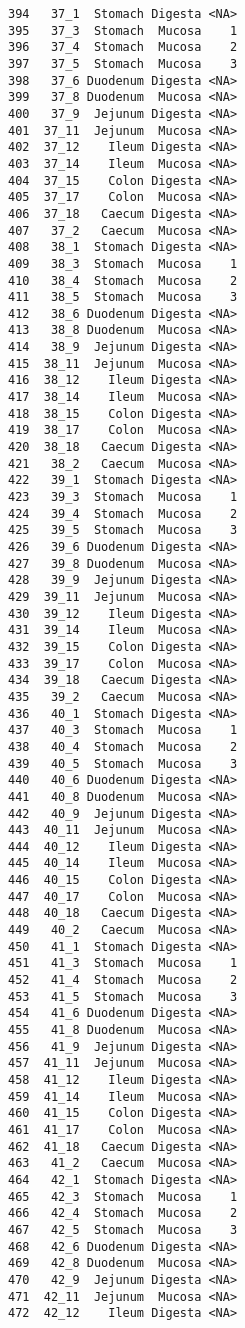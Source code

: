 \documentclass[
  letterpaper,
  DIV=11,
  numbers=noendperiod]{scrartcl}
\begin{document}
\begin{verbatim}
394   37_1  Stomach Digesta <NA>
395   37_3  Stomach  Mucosa    1
396   37_4  Stomach  Mucosa    2
397   37_5  Stomach  Mucosa    3
398   37_6 Duodenum Digesta <NA>
399   37_8 Duodenum  Mucosa <NA>
400   37_9  Jejunum Digesta <NA>
401  37_11  Jejunum  Mucosa <NA>
402  37_12    Ileum Digesta <NA>
403  37_14    Ileum  Mucosa <NA>
404  37_15    Colon Digesta <NA>
405  37_17    Colon  Mucosa <NA>
406  37_18   Caecum Digesta <NA>
407   37_2   Caecum  Mucosa <NA>
408   38_1  Stomach Digesta <NA>
409   38_3  Stomach  Mucosa    1
410   38_4  Stomach  Mucosa    2
411   38_5  Stomach  Mucosa    3
412   38_6 Duodenum Digesta <NA>
413   38_8 Duodenum  Mucosa <NA>
414   38_9  Jejunum Digesta <NA>
415  38_11  Jejunum  Mucosa <NA>
416  38_12    Ileum Digesta <NA>
417  38_14    Ileum  Mucosa <NA>
418  38_15    Colon Digesta <NA>
419  38_17    Colon  Mucosa <NA>
420  38_18   Caecum Digesta <NA>
421   38_2   Caecum  Mucosa <NA>
422   39_1  Stomach Digesta <NA>
423   39_3  Stomach  Mucosa    1
424   39_4  Stomach  Mucosa    2
425   39_5  Stomach  Mucosa    3
426   39_6 Duodenum Digesta <NA>
427   39_8 Duodenum  Mucosa <NA>
428   39_9  Jejunum Digesta <NA>
429  39_11  Jejunum  Mucosa <NA>
430  39_12    Ileum Digesta <NA>
431  39_14    Ileum  Mucosa <NA>
432  39_15    Colon Digesta <NA>
433  39_17    Colon  Mucosa <NA>
434  39_18   Caecum Digesta <NA>
435   39_2   Caecum  Mucosa <NA>
436   40_1  Stomach Digesta <NA>
437   40_3  Stomach  Mucosa    1
438   40_4  Stomach  Mucosa    2
439   40_5  Stomach  Mucosa    3
440   40_6 Duodenum Digesta <NA>
441   40_8 Duodenum  Mucosa <NA>
442   40_9  Jejunum Digesta <NA>
443  40_11  Jejunum  Mucosa <NA>
444  40_12    Ileum Digesta <NA>
445  40_14    Ileum  Mucosa <NA>
446  40_15    Colon Digesta <NA>
447  40_17    Colon  Mucosa <NA>
448  40_18   Caecum Digesta <NA>
449   40_2   Caecum  Mucosa <NA>
450   41_1  Stomach Digesta <NA>
451   41_3  Stomach  Mucosa    1
452   41_4  Stomach  Mucosa    2
453   41_5  Stomach  Mucosa    3
454   41_6 Duodenum Digesta <NA>
455   41_8 Duodenum  Mucosa <NA>
456   41_9  Jejunum Digesta <NA>
457  41_11  Jejunum  Mucosa <NA>
458  41_12    Ileum Digesta <NA>
459  41_14    Ileum  Mucosa <NA>
460  41_15    Colon Digesta <NA>
461  41_17    Colon  Mucosa <NA>
462  41_18   Caecum Digesta <NA>
463   41_2   Caecum  Mucosa <NA>
464   42_1  Stomach Digesta <NA>
465   42_3  Stomach  Mucosa    1
466   42_4  Stomach  Mucosa    2
467   42_5  Stomach  Mucosa    3
468   42_6 Duodenum Digesta <NA>
469   42_8 Duodenum  Mucosa <NA>
470   42_9  Jejunum Digesta <NA>
471  42_11  Jejunum  Mucosa <NA>
472  42_12    Ileum Digesta <NA>

\end{verbatim}
\end{document}
